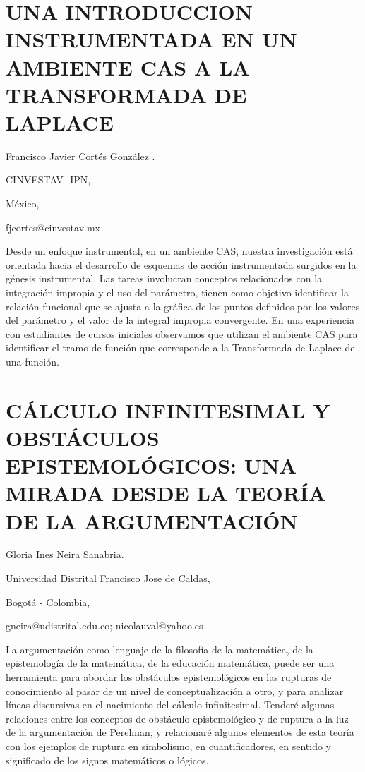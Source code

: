 \section{UNA INTRODUCCION INSTRUMENTADA EN UN AMBIENTE CAS A LA TRANSFORMADA
DE LAPLACE}

\begin{datos}

Francisco Javier Cortés González .

CINVESTAV- IPN, 

México,

fjcortes@cinvestav.mx

\end{datos}

Desde un enfoque instrumental, en un ambiente CAS, nuestra investigación
está orientada hacia el desarrollo de esquemas de acción instrumentada
surgidos en la génesis instrumental. Las tareas involucran conceptos
relacionados con la integración impropia y el uso del parámetro, tienen
como objetivo identificar la relación funcional que se ajusta a la
gráfica de los puntos definidos por los valores del parámetro y el
valor de la integral impropia convergente. En una experiencia con
estudiantes de cursos iniciales observamos que utilizan el ambiente
CAS para identificar el tramo de función que corresponde a la Transformada
de Laplace de una función.


\section{CÁLCULO INFINITESIMAL Y OBSTÁCULOS EPISTEMOLÓGICOS: UNA MIRADA DESDE
LA TEORÍA DE LA ARGUMENTACIÓN}

\begin{datos}

Gloria Ines Neira Sanabria.

Universidad Distrital Francisco Jose de Caldas,

Bogotá - Colombia,

gneira@udistrital.edu.co; nicolauval@yahoo.es

\end{datos}

La argumentación como lenguaje de la filosofía de la matemática, de
la epistemología de la matemática, de la educación matemática, puede
ser una herramienta para abordar los obstáculos epistemológicos en
las rupturas de conocimiento al pasar de un nivel de conceptualización
a otro, y para analizar líneas discursivas en el nacimiento del cálculo
infinitesimal. Tenderé algunas relaciones entre los conceptos de obstáculo
epistemológico y de ruptura a la luz de la argumentación de Perelman,
y relacionaré algunos elementos de esta teoría con los ejemplos de
ruptura en simbolismo, en cuantificadores, en sentido y significado
de los signos matemáticos o lógicos.


